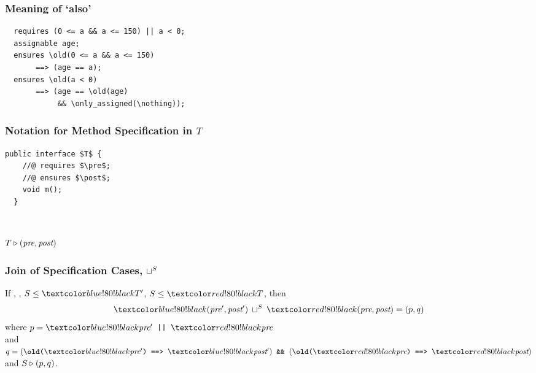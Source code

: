 \begin{frame}[fragile]
\frametitle{Meaning of `also'}

\begin{lstlisting}
  requires (0 <= a && a <= 150) || a < 0;
  assignable age;
  ensures \old(0 <= a && a <= 150)
       ==> (age == a);
  ensures \old(a < 0)
       ==> (age == \old(age)
            && \only_assigned(\nothing));
\end{lstlisting}
\end{frame}

\begin{frame}[fragile]
\frametitle{Notation for Method Specification in $T$}

\begin{lstlisting}[mathescape=true]
  public interface $T$ {
    //@ requires $\pre$;
    //@ ensures $\post$;
    void m();
  }
\end{lstlisting}

~

$T \triangleright ({\textit{pre}}, {\textit{post}})$
\end{frame}


\begin{frame}
\frametitle{Join of Specification Cases, $\sqcup^{S}$}
\begin{definition}
If , ,
$S \STO \BLUE{T'}$, $S \STO \RED{T}$, 
then
\begin{displaymath}
\BLUE{(\pre',\post')} \:\join^S\: \RED{(\pre,\post)} = (p,q)
\end{displaymath}
where $p = \BLUE{\pre'} \mbox{\texttt{ || }} \RED{\pre}$ \\
and $q = (\texttt{\textbackslash\textbf{old}(}\BLUE{\pre'}\texttt{)}
   \mbox{\texttt{ ==> }} \BLUE{\post'})
\mbox{\texttt{ \&\& }}
  (\texttt{\textbackslash\textbf{old}(}\RED{\pre}\texttt{)}
   \mbox{\texttt{ ==> }} \RED{\post})$ \\
and $S \triangleright (p, q)$.
\end{definition}
\end{frame}


